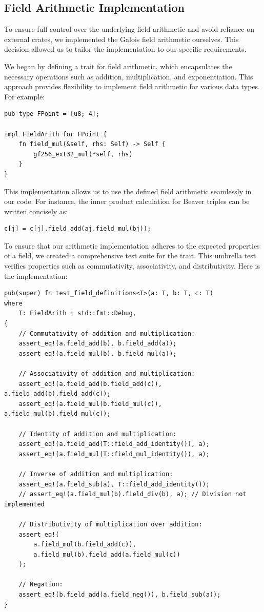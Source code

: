 \documentclass[11pt]{report}
\theoremstyle{definition}
\theoremstyle{plain}
\begin{document}
\subsection{Field Arithmetic Implementation}\label{sub:field_arithmetic}
To ensure full control over the underlying field arithmetic and avoid reliance on external crates, we implemented the Galois field arithmetic ourselves. This decision allowed us to tailor the implementation to our specific requirements.

We began by defining a trait for field arithmetic, which encapsulates the necessary operations such as addition, multiplication, and exponentiation. This approach provides flexibility to implement field arithmetic for various data types. For example:

\begin{verbatim}
pub type FPoint = [u8; 4];

impl FieldArith for FPoint {
    fn field_mul(&self, rhs: Self) -> Self {
        gf256_ext32_mul(*self, rhs)
    }
}
\end{verbatim}

This implementation allows us to use the defined field arithmetic seamlessly in our code. For instance, the inner product calculation for Beaver triples can be written concisely as:

\begin{verbatim}
c[j] = c[j].field_add(aj.field_mul(bj));
\end{verbatim}

To ensure that our arithmetic implementation adheres to the expected properties of a field, we created a comprehensive test suite for the trait. This umbrella test verifies properties such as commutativity, associativity, and distributivity. Here is the implementation:

\begin{verbatim}
pub(super) fn test_field_definitions<T>(a: T, b: T, c: T)
where
    T: FieldArith + std::fmt::Debug,
{
    // Commutativity of addition and multiplication:
    assert_eq!(a.field_add(b), b.field_add(a));
    assert_eq!(a.field_mul(b), b.field_mul(a));

    // Associativity of addition and multiplication:
    assert_eq!(a.field_add(b.field_add(c)), a.field_add(b).field_add(c));
    assert_eq!(a.field_mul(b.field_mul(c)), a.field_mul(b).field_mul(c));

    // Identity of addition and multiplication:
    assert_eq!(a.field_add(T::field_add_identity()), a);
    assert_eq!(a.field_mul(T::field_mul_identity()), a);

    // Inverse of addition and multiplication:
    assert_eq!(a.field_sub(a), T::field_add_identity());
    // assert_eq!(a.field_mul(b).field_div(b), a); // Division not implemented

    // Distributivity of multiplication over addition:
    assert_eq!(
        a.field_mul(b.field_add(c)),
        a.field_mul(b).field_add(a.field_mul(c))
    );

    // Negation:
    assert_eq!(b.field_add(a.field_neg()), b.field_sub(a));
}
\end{verbatim}
\end{document}
